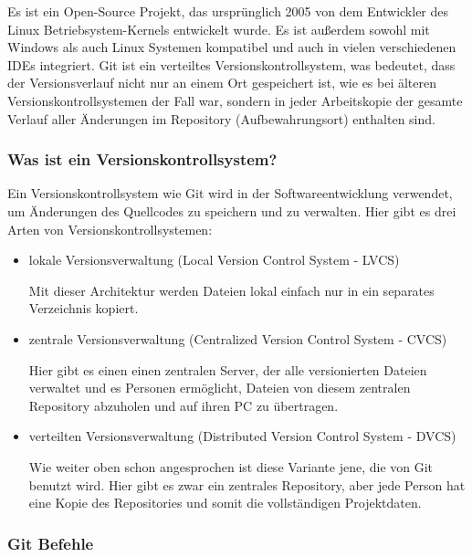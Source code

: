 Es ist ein Open-Source Projekt, 
das ursprünglich 2005 von dem Entwickler des Linux Betriebsystem-Kernels entwickelt wurde. Es ist außerdem sowohl mit 
Windows als auch Linux Systemen kompatibel und auch in vielen verschiedenen IDEs integriert. Git ist ein verteiltes Versionskontrollsystem, 
was bedeutet, dass der Versionsverlauf nicht nur an einem Ort gespeichert ist, wie es bei älteren Versionskontrollsystemen der Fall war, 
sondern in jeder Arbeitskopie der gesamte Verlauf aller Änderungen im Repository (Aufbewahrungsort) enthalten sind. 
\cite{sysarch-git-2}

\subsubsection{Was ist ein Versionskontrollsystem?}

Ein Versionskontrollsystem wie Git wird in der Softwareentwicklung verwendet, 
um Änderungen des Quellcodes zu speichern und zu verwalten. 
Hier gibt es drei Arten von Versionskontrollsystemen:
\cite{sysarch-git-2}

\begin{itemize}
    \item lokale Versionsverwaltung (Local Version Control System - LVCS)

    Mit dieser Architektur werden Dateien lokal einfach nur in ein separates Verzeichnis kopiert.
    \cite{sysarch-git-2}

    \item zentrale Versionsverwaltung (Centralized Version Control System - CVCS)
    
    Hier gibt es einen einen zentralen Server, der alle versionierten Dateien verwaltet und es Personen ermöglicht, 
    Dateien von diesem zentralen Repository abzuholen und auf ihren PC zu übertragen.
    \cite{sysarch-git-2}

    \item verteilten Versionsverwaltung (Distributed Version Control System - DVCS)
    
    Wie weiter oben schon angesprochen ist diese Variante jene, die von Git benutzt wird. Hier gibt es zwar ein zentrales Repository, 
    aber jede Person  hat eine Kopie des Repositories und somit die vollständigen Projektdaten.
    \cite{sysarch-git-2}
\end{itemize}

\subsubsection{Git Befehle}

